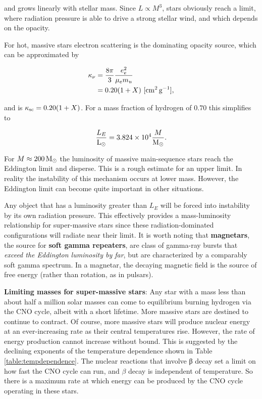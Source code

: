 \documentclass[a4paper,10pt]{article}
\begin{document}
{\noindent}and grows linearly with stellar mass. Since $L\propto M^3$, stars obviously reach a limit, where radiation pressure is able to drive a strong stellar wind, and which depends on the opacity.

{\noindent}For hot, massive stars electron scattering is the dominating opacity source, which can be approximated by

\begin{align*}
    \kappa_\nu &= \frac{8\pi}{3} \frac{e_e^2}{\mu_em_u} \\
    &= 0.20(1+X) ~ [{\rm cm^2\,g^{-1}}],
\end{align*}

and is $\kappa_{\rm sc}=0.20(1+X)$. For a mass fraction of hydrogen of $0.70$ this simplifies to

\begin{align*}
    \frac{L_E}{{\rm L_\odot}} = 3.824\times10^4\frac{M}{{\rm M_\odot}}.
\end{align*}

{\noindent}For $M\approx200\,{\rm M_\odot}$ the luminosity of massive main-sequence stars reach the Eddington limit and disperse. This is a rough estimate for an upper limit. In reality the instability of this mechanism occurs at lower mass. However, the Eddington limit can become quite important in other situations.

{\noindent}Any object that has a luminosity greater than $L_E$ will be forced into instability by its own radiation pressure. This effectively provides a mass-luminosity relationship for super-massive stars since these radiation-dominated configurations will radiate near their limit. It is worth noting that \textbf{magnetars}, the source for \textbf{soft gamma repeaters}, are class of gamma-ray bursts that \textit{exceed the Eddington luminosity by far}, but are characterized by a comparably soft gamma spectrum. In a magnetar, the decaying magnetic field is the source of free energy (rather than rotation, as in pulsars).

{\noindent}\textbf{Limiting masses for super-massive stars}: Any star with a mass less than about half a million solar masses can come to equilibrium burning hydrogen via the CNO cycle, albeit with a short lifetime. More massive stars are destined to continue to contract. Of course, more massive stars will produce nuclear energy at an ever-increasing rate as their central temperatures rise. However, the rate of energy production cannot increase without bound. This is suggested by the declining exponents of the temperature dependence shown in Table \ref{table:tempdependence}. The nuclear reactions that involve β decay set a limit on how fast the CNO cycle can run, and $\beta$ decay is independent of temperature. So there is a maximum rate at which energy can be produced by the CNO cycle operating in these stars.
\end{document}
